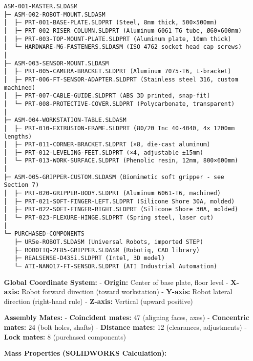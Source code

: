 \documentclass[
]{article}
\begin{document}
\begin{verbatim}
ASM-001-MASTER.SLDASM
├─ ASM-002-ROBOT-MOUNT.SLDASM
│  ├─ PRT-001-BASE-PLATE.SLDPRT (Steel, 8mm thick, 500×500mm)
│  ├─ PRT-002-RISER-COLUMN.SLDPRT (Aluminum 6061-T6 tube, Ø60×600mm)
│  ├─ PRT-003-TOP-MOUNT-PLATE.SLDPRT (Aluminum plate, 10mm thick)
│  └─ HARDWARE-M6-FASTENERS.SLDASM (ISO 4762 socket head cap screws)
│
├─ ASM-003-SENSOR-MOUNT.SLDASM
│  ├─ PRT-005-CAMERA-BRACKET.SLDPRT (Aluminum 7075-T6, L-bracket)
│  ├─ PRT-006-FT-SENSOR-ADAPTER.SLDPRT (Stainless steel 316, custom machined)
│  ├─ PRT-007-CABLE-GUIDE.SLDPRT (ABS 3D printed, snap-fit)
│  └─ PRT-008-PROTECTIVE-COVER.SLDPRT (Polycarbonate, transparent)
│
├─ ASM-004-WORKSTATION-TABLE.SLDASM
│  ├─ PRT-010-EXTRUSION-FRAME.SLDPRT (80/20 Inc 40-4040, 4× 1200mm lengths)
│  ├─ PRT-011-CORNER-BRACKET.SLDPRT (×8, die-cast aluminum)
│  ├─ PRT-012-LEVELING-FEET.SLDPRT (×4, adjustable ±15mm)
│  └─ PRT-013-WORK-SURFACE.SLDPRT (Phenolic resin, 12mm, 800×600mm)
│
├─ ASM-005-GRIPPER-CUSTOM.SLDASM (Biomimetic soft gripper - see Section 7)
│  ├─ PRT-020-GRIPPER-BODY.SLDPRT (Aluminum 6061-T6, machined)
│  ├─ PRT-021-SOFT-FINGER-LEFT.SLDPRT (Silicone Shore 30A, molded)
│  ├─ PRT-022-SOFT-FINGER-RIGHT.SLDPRT (Silicone Shore 30A, molded)
│  └─ PRT-023-FLEXURE-HINGE.SLDPRT (Spring steel, laser cut)
│
└─ PURCHASED-COMPONENTS
   ├─ UR5e-ROBOT.SLDASM (Universal Robots, imported STEP)
   ├─ ROBOTIQ-2F85-GRIPPER.SLDASM (Robotiq, CAD library)
   ├─ REALSENSE-D435i.SLDPRT (Intel, 3D model)
   └─ ATI-NANO17-FT-SENSOR.SLDPRT (ATI Industrial Automation)
\end{verbatim}

\textbf{Global Coordinate System:} - \textbf{Origin:} Center of base
plate, floor level - \textbf{X-axis:} Robot forward direction (toward
workstation) - \textbf{Y-axis:} Robot lateral direction (right-hand
rule) - \textbf{Z-axis:} Vertical (upward positive)

\textbf{Assembly Mates:} - \textbf{Coincident mates:} 47 (aligning
faces, axes) - \textbf{Concentric mates:} 24 (bolt holes, shafts) -
\textbf{Distance mates:} 12 (clearances, adjustments) - \textbf{Lock
mates:} 8 (purchased components)

\textbf{Mass Properties (SOLIDWORKS Calculation):}
\end{document}
